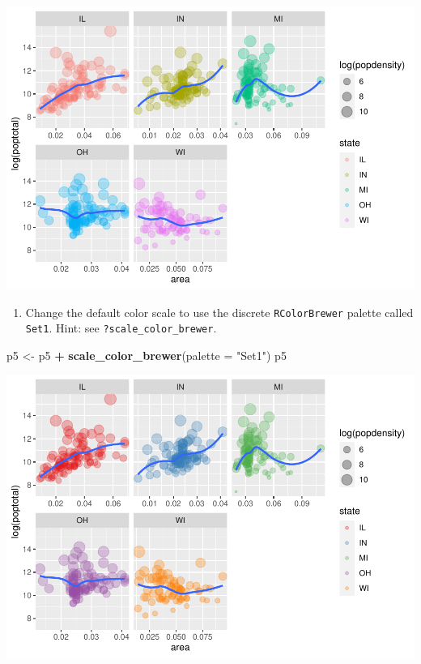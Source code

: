 \documentclass[
]{book}
\newenvironment{Shaded}{\begin{snugshade}}{\end{snugshade}}
\newcommand{\DataTypeTok}[1]{\textcolor[rgb]{0.13,0.29,0.53}{#1}}
\newcommand{\KeywordTok}[1]{\textcolor[rgb]{0.13,0.29,0.53}{\textbf{#1}}}
\newcommand{\NormalTok}[1]{#1}
\newcommand{\OperatorTok}[1]{\textcolor[rgb]{0.81,0.36,0.00}{\textbf{#1}}}
\newcommand{\StringTok}[1]{\textcolor[rgb]{0.31,0.60,0.02}{#1}}
\providecommand{\tightlist}{%
  \setlength{\itemsep}{0pt}\setlength{\parskip}{0pt}}
\begin{document}
\begin{alert}
\includegraphics{R/Rgraphics/figures/unnamed-chunk-231-1.pdf}

\begin{enumerate}
\def\labelenumi{\arabic{enumi}.}
\setcounter{enumi}{4}
\tightlist
\item
  Change the default color scale to use the discrete \texttt{RColorBrewer} palette called \texttt{Set1}. Hint: see \texttt{?scale\_color\_brewer}.
\end{enumerate}

\begin{Shaded}
\begin{Highlighting}[]
\NormalTok{p5 \textless{}{-}}\StringTok{ }\NormalTok{p5 }\OperatorTok{+}\StringTok{ }\KeywordTok{scale\_color\_brewer}\NormalTok{(}\DataTypeTok{palette =} \StringTok{"Set1"}\NormalTok{)}
\NormalTok{p5}
\end{Highlighting}
\end{Shaded}

\includegraphics{R/Rgraphics/figures/unnamed-chunk-232-1.pdf}


\end{alert}
\end{document}
